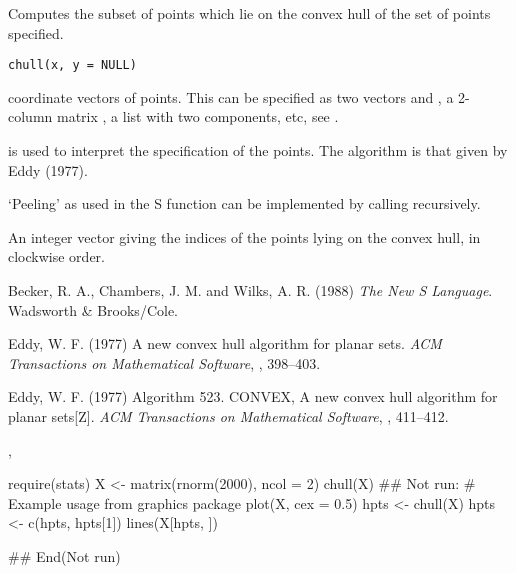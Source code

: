 %
\begin{Description}\relax
Computes the subset of points which lie on the convex hull of the
set of points specified.
\end{Description}
%
\begin{Usage}
\begin{verbatim}
chull(x, y = NULL)
\end{verbatim}
\end{Usage}
%
\begin{Arguments}
\begin{ldescription}
\item[\code{x, y}] coordinate vectors of points. This can be specified as two
vectors  and , a 2-column matrix , a list
 with two components, etc, see .
\end{ldescription}
\end{Arguments}
%
\begin{Details}\relax
{} is used to interpret the
specification of the points. The algorithm is that given by Eddy (1977).

`Peeling' as used in the S function  can be
implemented by calling  recursively.
\end{Details}
%
\begin{Value}
An integer vector giving the indices of the points lying on the
convex hull, in clockwise order.
\end{Value}
%
\begin{References}\relax
Becker, R. A., Chambers, J. M. and Wilks, A. R. (1988)
\emph{The New S Language}.
Wadsworth \& Brooks/Cole.

Eddy, W. F. (1977) A new convex hull algorithm for planar sets.
\emph{ACM Transactions on Mathematical Software}, , 398--403.

Eddy, W. F. (1977) Algorithm 523. CONVEX, A new convex hull
algorithm for planar sets[Z]. \emph{ACM Transactions on
Mathematical Software}, , 411--412.
\end{References}
%
\begin{SeeAlso}\relax
{},
\end{SeeAlso}
%
\begin{Examples}
\begin{ExampleCode}
require(stats)
X <- matrix(rnorm(2000), ncol = 2)
chull(X)
## Not run: 
  # Example usage from graphics package
  plot(X, cex = 0.5)
  hpts <- chull(X)
  hpts <- c(hpts, hpts[1])
  lines(X[hpts, ])

## End(Not run)
\end{ExampleCode}
\end{Examples}
